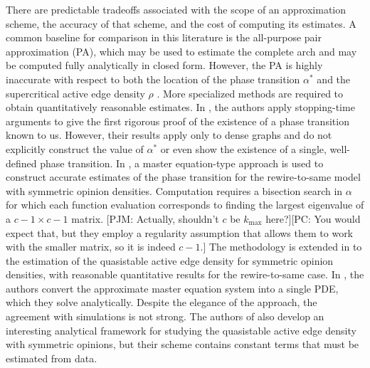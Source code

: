 \documentclass[review, onefignum, onetabnum]{siamart171218}
\newcommand{\pjm}[1]{{\color{blue}[PJM: #1]}}
\newcommand{\pc}[1]{{\color{comment_purple}[PC: #1]}}
\begin{document}
	There are predictable tradeoffs associated with the scope of an approximation scheme, the accuracy of that scheme, and the cost of computing its estimates. 
	A common baseline for comparison in this literature is the all-purpose pair approximation (PA), which may be used to estimate the complete arch and may be computed fully analytically in closed form. 
	However, the PA is highly inaccurate with respect to both the location of the phase transition $\alpha^*$ and the supercritical active edge density $\rho$ \cite{Demirel2012, Durrett2012}. 
	More specialized methods are required to obtain quantitatively reasonable estimates. 
	In \cite{Basu2015a}, the authors apply stopping-time arguments to give the first rigorous proof of the existence of a phase transition known to us. 
	However, their results apply only to dense graphs and do not explicitly construct the value of $\alpha^*$ or even show the existence of a single, well-defined phase transition. 
	In \cite{Bohme2011}, a master equation-type approach is used to construct accurate estimates of the phase transition for the rewire-to-same model with symmetric opinion densities. 
	Computation requires a bisection search in $\alpha$ for which each function evaluation corresponds to finding the largest eigenvalue of a $c-1 \times c-1$ matrix. \pjm{Actually, shouldn't $c$ be $k_\mathrm{max}$ here?}\pc{You would expect that, but they employ a regularity assumption that allows them to work with the smaller matrix, so it is indeed $c-1$.}
	The methodology is extended in \cite{Demirel2012} to the estimation of the quasistable active edge density for symmetric opinion densities, with reasonable quantitative results for the rewire-to-same case. 
	In \cite{Silk2014}, the authors convert the approximate master equation system into a single PDE, which they solve analytically. 
	Despite the elegance of the approach, the agreement with simulations is not strong. 
	The authors of \cite{Ji2013} also develop an interesting analytical framework for studying the quasistable active edge density with symmetric opinions, but their scheme contains constant terms that must be estimated from data. 
\end{document}
